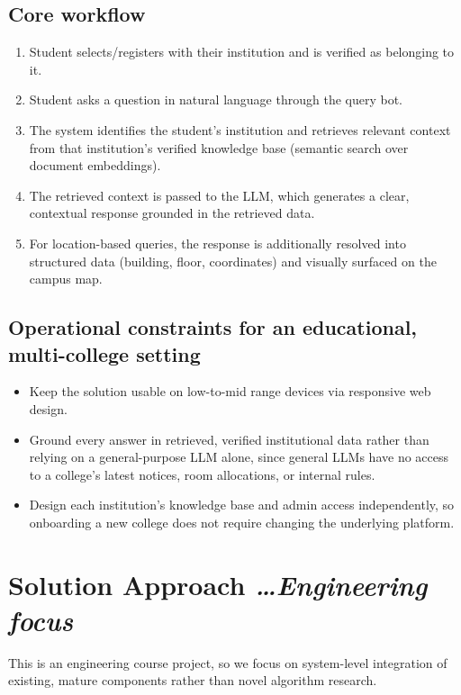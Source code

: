 \documentclass[11pt,a4paper]{article}
\newcommand{\BvrHint}[1]{%
  {\normalfont\normalsize\itshape\hfill #1}}
\begin{document}
\subsection{Core workflow}
\begin{enumerate}[leftmargin=0.7cm]
    \item Student selects/registers with their institution and is verified as belonging to it.
    \item Student asks a question in natural language through the query bot.
    \item The system identifies the student's institution and retrieves relevant context from that institution's verified knowledge base (semantic search over document embeddings).
    \item The retrieved context is passed to the LLM, which generates a clear, contextual response grounded in the retrieved data.
    \item For location-based queries, the response is additionally resolved into structured data (building, floor, coordinates) and visually surfaced on the campus map.
\end{enumerate}

\subsection{Operational constraints for an educational, multi-college setting}
\begin{itemize}[leftmargin=0.7cm]
    \item Keep the solution usable on low-to-mid range devices via responsive web design.
    \item Ground every answer in retrieved, verified institutional data rather than relying on a general-purpose LLM alone, since general LLMs have no access to a college's latest notices, room allocations, or internal rules.
    \item Design each institution's knowledge base and admin access independently, so onboarding a new college does not require changing the underlying platform.
\end{itemize}

\section{Solution Approach %
\BvrHint{\ldots Engineering focus}}
This is an engineering course project, so we focus on system-level
integration of existing, mature components rather than novel algorithm
research.
\end{document}
